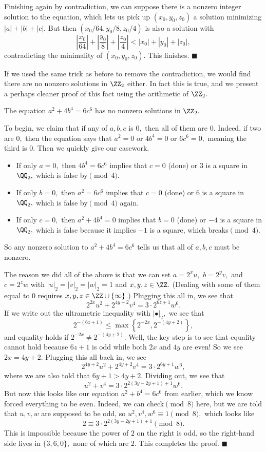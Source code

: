 Finishing again by contradiction, we can suppose there is a nonzero integer solution to the equation, which lets us pick up $(x_0,y_0,z_0)$ a solution minimizing $|a|+|b|+|c|.$ But then $(x_0/64,y_0/8,z_0/4)$ is also a solution with
\[\left|\frac{x_0}{64}\right|+\left|\frac{y_0}8\right|+\left|\frac{z_0}4\right|<|x_0|+|y_0|+|z_0|,\]
contradicting the minimality of $(x_0,y_0,z_0).$ This finishes. $\blacksquare$

If we used the same trick as before to remove the contradiction, we would find there are no nonzero solutions in $\ZZ_2$ either. In fact this is true, and we present a perhaps cleaner proof of this fact using the arithmetic of $\ZZ_2.$
\begin{lemma}
    The equation $a^2+4b^4=6c^6$ has no nonzero solutions in $\ZZ_2.$
\end{lemma}
To begin, we claim that if any of $a,b,c$ is $0,$ then all of them are $0.$ Indeed, if two are $0,$ then the equation says that $a^2=0$ or $4b^4=0$ or $6c^6=0,$ meaning the third is $0.$ Then we quickly give our casework.
\begin{itemize}
    \item If only $a=0,$ then $4b^4=6c^6$ implies that $c=0$ (done) or $3$ is a square in $\QQ_2,$ which is false by$\pmod4.$
    \item If only $b=0,$ then $a^2=6c^6$ implies that $c=0$ (done) or $6$ is a square in $\QQ_2,$ which is false by$\pmod4$ again.
    \item If only $c=0,$ then $a^2+4b^4=0$ implies that $b=0$ (done) or $-4$ is a square in $\QQ_2,$ which is false because it implies $-1$ is a square, which breaks$\pmod4.$
\end{itemize}
So any nonzero solution to $a^2+4b^4=6c^6$ tells us that all of $a,b,c$ must be nonzero.

The reason we did all of the above is that we can set $a=2^xu,$ $b=2^yv,$ and $c=2^zw$ with $|u|_2=|v|_2=|w|_2=1$ and $x,y,z\in\ZZ.$ (Dealing with some of them equal to $0$ requires $x,y,z\in\ZZ\cup\{\infty\}$.) Plugging this all in, we see that
\[2^{2x}u^2+2^{4y+2}v^4=3\cdot2^{6z+1}w^6.\]
If we write out the ultrametric inequality with $|\bullet|_2,$ we see that
\[2^{-(6z+1)}\le\max\left\{2^{-2x},2^{-(4y+2)}\right\},\]
and equality holds if $2^{-2x}\ne2^{-(4y+2)}.$ Well, the key step is to see that equality cannot hold because $6z+1$ is odd while both $2x$ and $4y$ are even! So we see $2x=4y+2.$ Plugging this all back in, we see
\[2^{4y+2}u^2+2^{4y+2}v^4=3\cdot2^{6y+1}w^6,\]
where we are also told that $6y+1>4y+2.$ Dividing out, we see that
\[u^2+v^4=3\cdot2^{2(3y-2y+1)+1}w^6.\]
But now this looks like our equation $a^2+b^4=6c^6$ from earlier, which we know forced everything to be even. Indeed, we can check$\pmod8$ here, but we are told that $u,v,w$ are supposed to be odd, so $u^2,v^4,w^6\equiv1\pmod8,$ which looks like
\[2\equiv3\cdot2^{2(3y-2y+1)+1}\pmod8.\]
This is impossible because the power of $2$ on the right is odd, so the right-hand side lives in $\{3,6,0\},$ none of which are $2.$ This completes the proof. $\blacksquare$

